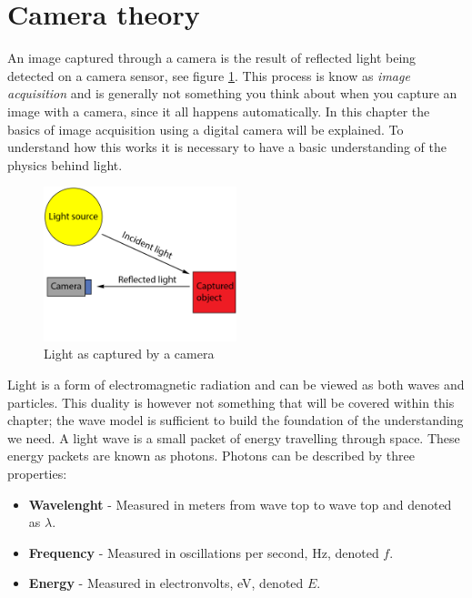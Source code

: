 \section{Camera theory}

An image captured through a camera is the result of reflected light being detected on a camera sensor, see figure \ref{fig:light_cam}. This process is know as \textit{image acquisition} and is generally not something you think about when you capture an image with a camera, since it all happens automatically. In this chapter the basics of image acquisition using a digital camera will be explained. To understand how this works it is necessary to have a basic understanding of the physics behind light.

\begin{figure}[htbp] 
\centering 
\includegraphics[width=0.5\textwidth]{Pictures/Theory/light_from_sun.png} 
\caption{Light as captured by a camera} 
\label{fig:light_cam} 
\end{figure}

Light is a form of electromagnetic radiation and can be viewed as both waves and particles. This duality is however not something that will be covered within this chapter; the wave model is sufficient to build the foundation of the understanding we need. A light wave is a small packet of energy travelling through space. These energy packets are known as photons. Photons can be described by three properties:

\begin{itemize}
\item \textbf{Wavelenght} - Measured in meters from wave top to wave top and denoted as $\lambda$.
\item \textbf{Frequency} - Measured in oscillations per second, Hz, denoted $f$.
\item \textbf{Energy} - Measured in electronvolts, eV, denoted $E$.
\end{itemize}

